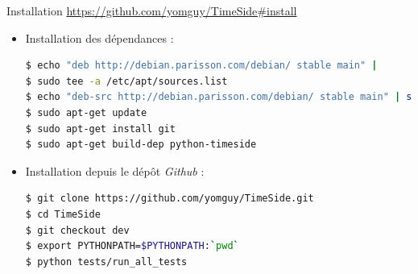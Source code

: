 \documentclass[10pt, final, hyperref, table]{beamer}
\begin{document}
\begin{frame}[fragile]
  \begin{block}{Installation}
\url{https://github.com/yomguy/TimeSide\#install}
    \begin{itemize}
    \item Installation des dépendances :
\begin{lstlisting}[language=bash, basicstyle=\TINY]
$ echo "deb http://debian.parisson.com/debian/ stable main" |
$ sudo tee -a /etc/apt/sources.list 
$ echo "deb-src http://debian.parisson.com/debian/ stable main" | sudo tee -a /etc/apt/sources.list 
$ sudo apt-get update 
$ sudo apt-get install git 
$ sudo apt-get build-dep python-timeside
\end{lstlisting}

    \item Installation depuis le dépôt \emph{Github} :
\begin{lstlisting}[language=bash, basicstyle=\TINY]
$ git clone https://github.com/yomguy/TimeSide.git 
$ cd TimeSide 
$ git checkout dev 
$ export PYTHONPATH=$PYTHONPATH:`pwd` 
$ python tests/run_all_tests
\end{lstlisting}
\end{itemize}
\end{block}
\end{frame}
\end{document}
